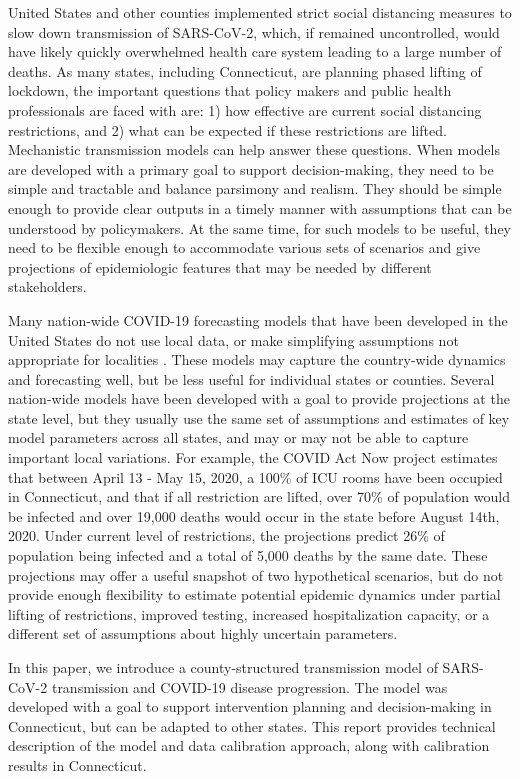 \documentclass[11pt]{article}
\begin{document}
United States and other counties implemented strict social distancing measures to slow down transmission of SARS-CoV-2, which, if remained uncontrolled, would have likely quickly overwhelmed health care system leading to a large number of deaths. 
As many states, including Connecticut, are planning phased lifting of lockdown, the important questions that policy makers and public health professionals are faced with are: 1) how effective are current social distancing restrictions, and 2) what can be expected if these restrictions are lifted. Mechanistic transmission models can help answer these questions. When models are developed with a primary goal to support decision-making, they need to be simple and tractable and balance parsimony and realism. They should be simple enough to provide clear outputs in a timely manner with assumptions that can be understood by policymakers. At the same time, for such models to be useful, they need to be flexible enough to accommodate various sets of scenarios and give projections of epidemiologic features that may be needed by different stakeholders.

Many nation-wide COVID-19 forecasting models that have been developed in the United States do not use local data, or make simplifying assumptions not appropriate for localities \citep{cdc2020covid19forecasts}. These models may capture the country-wide dynamics and forecasting well, but be less useful for individual states or counties. Several nation-wide models have been developed with a goal to provide projections at the state level, but they usually use the same set of assumptions and estimates of key model parameters across all states, and may or may not be able to capture important local variations. For example, the COVID Act Now project \citep{covidactnow2020you} estimates that between April 13 - May 15, 2020, a 100\% of ICU rooms have been occupied in Connecticut, and that if all restriction are lifted, over 70\% of population would be infected and over 19,000 deaths would occur in the state before August 14th, 2020. Under current level of restrictions, the projections predict 26\% of population being infected and a total of 5,000 deaths by the same date. These projections may offer a useful snapshot of two hypothetical scenarios, but do not provide enough flexibility to estimate potential epidemic dynamics under partial lifting of restrictions, improved testing, increased hospitalization capacity, or a different set of assumptions about highly uncertain parameters.  

In this paper, we introduce a county-structured transmission model of SARS-CoV-2 transmission and COVID-19 disease progression. The model was developed with a goal to support intervention planning and decision-making in Connecticut, but can be adapted to other states. This report provides technical description of the model and data calibration approach, along with calibration results in Connecticut. 
\end{document}
